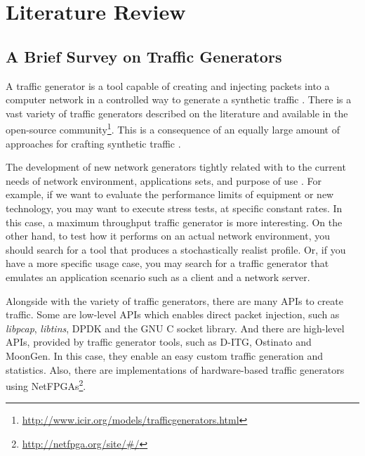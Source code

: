 \chapter{Literature Review}\label{ch:literature-review}

\section{A Brief Survey on Traffic Generators}\label{sec:traffic-gen}

A traffic generator is a tool capable of creating and injecting packets into a computer network in a controlled way to generate a synthetic traffic \cite{validate-trafficgen}.  There is a vast variety of traffic generators described on the literature \cite{validate-trafficgen} \cite{ditg-paper} and available in the open-source community\footnote{\href{http://www.icir.org/models/trafficgenerators.html}{http://www.icir.org/models/trafficgenerators.html}}. This is a consequence of an equally large amount of approaches for crafting synthetic traffic \cite{validate-trafficgen}.

The development of new network generators tightly related with to the current needs of network environment, applications sets, and purpose of use \cite{validate-trafficgen}. For example, if we want to evaluate the performance limits of equipment or new technology, you may want to execute stress tests, at specific constant rates. In this case, a maximum throughput traffic generator is more interesting\cite{validate-trafficgen}. On the other hand, to test how it performs on an actual network environment, you should search for a tool that produces a stochastically realist profile. Or, if you have a more specific usage case, you may search for a traffic generator that emulates an application scenario such as a client and a network server\cite{surge-paper}. 


Alongside with the variety of traffic generators, there are many APIs to create traffic. Some are low-level APIs which enables direct packet injection, such as \textit{libpcap}\cite{web-tcpdump}, \textit{libtins}\cite{web-libtins}, DPDK\cite{web-dpdk} and the GNU C socket library\cite{web-socket}. And there are high-level APIs, provided by traffic generator tools, such as D-ITG\cite{ditg-paper}, Ostinato\cite{web-ostinato} and MoonGen\cite{moongen-paper}. In this case, they enable an easy custom traffic generation and statistics. Also, there are implementations of hardware-based traffic generators using NetFPGAs\footnote{\href{http://netfpga.org/site/\#/}{http://netfpga.org/site/\#/}}.



